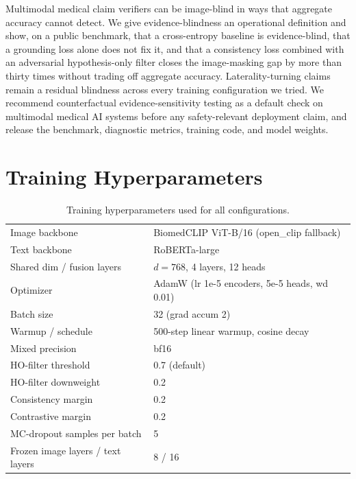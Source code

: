 \documentclass[pmlr]{jmlr}
\begin{document}
Multimodal medical claim verifiers can be image-blind in ways that aggregate accuracy cannot detect. We give evidence-blindness an operational definition and show, on a public benchmark, that a cross-entropy baseline is evidence-blind, that a grounding loss alone does not fix it, and that a consistency loss combined with an adversarial hypothesis-only filter closes the image-masking gap by more than thirty times without trading off aggregate accuracy. Laterality-turning claims remain a residual blindness across every training configuration we tried. We recommend counterfactual evidence-sensitivity testing as a default check on multimodal medical AI systems before any safety-relevant deployment claim, and release the benchmark, diagnostic metrics, training code, and model weights.



\appendix

\section{Training Hyperparameters}

\begin{table}[h]
\centering
\small
\caption{Training hyperparameters used for all configurations.}
\begin{tabular}{ll}
\toprule
Image backbone & BiomedCLIP ViT-B/16 (open\_clip fallback) \\
Text backbone & RoBERTa-large \\
Shared dim / fusion layers & $d = 768$, 4 layers, 12 heads \\
Optimizer & AdamW (lr 1e-5 encoders, 5e-5 heads, wd 0.01) \\
Batch size & 32 (grad accum 2) \\
Warmup / schedule & 500-step linear warmup, cosine decay \\
Mixed precision & bf16 \\
HO-filter threshold & 0.7 (default) \\
HO-filter downweight & 0.2 \\
Consistency margin & 0.2 \\
Contrastive margin & 0.2 \\
MC-dropout samples per batch & 5 \\
Frozen image layers / text layers & 8 / 16 \\
\bottomrule
\end{tabular}
\end{table}
\end{document}
